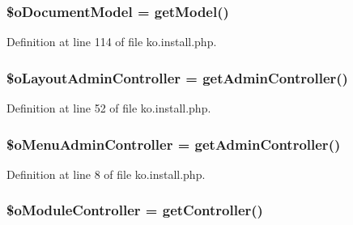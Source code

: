 \subsubsection[{\$o\+Document\+Model}]{\setlength{\rightskip}{0pt plus 5cm}\$o\+Document\+Model = {\bf get\+Model}(\textquotesingle{})}\label{ko_8install_8php_afb18aa87e5520385e76377e876e042af}


Definition at line 114 of file ko.\+install.\+php.

\hypertarget{ko_8install_8php_a6a03496003da7df71cf94d9accb430be}{}
\subsubsection[{\$o\+Layout\+Admin\+Controller}]{\setlength{\rightskip}{0pt plus 5cm}\$o\+Layout\+Admin\+Controller = {\bf get\+Admin\+Controller}(\textquotesingle{})}\label{ko_8install_8php_a6a03496003da7df71cf94d9accb430be}


Definition at line 52 of file ko.\+install.\+php.

\hypertarget{ko_8install_8php_a9062530c3b03479ca4530daee1c18887}{}
\subsubsection[{\$o\+Menu\+Admin\+Controller}]{\setlength{\rightskip}{0pt plus 5cm}\$o\+Menu\+Admin\+Controller = {\bf get\+Admin\+Controller}(\textquotesingle{})}\label{ko_8install_8php_a9062530c3b03479ca4530daee1c18887}


Definition at line 8 of file ko.\+install.\+php.

\hypertarget{ko_8install_8php_aaae9128654f5054258982d94a0566987}{}
\subsubsection[{\$o\+Module\+Controller}]{\setlength{\rightskip}{0pt plus 5cm}\$o\+Module\+Controller = {\bf get\+Controller}(\textquotesingle{})}\label{ko_8install_8php_aaae9128654f5054258982d94a0566987}


